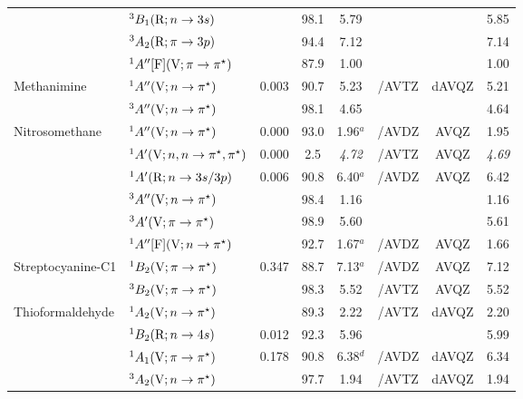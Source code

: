 \begin{tabular}{llcccccc}
                        &$^3B_1 (\mathrm{R};n \rightarrow 3s)$ 						&		&98.1 &5.79		&			&			&5.85	\\
                        &$^3A_2 (\mathrm{R};\pi \rightarrow 3p)$ 						&		&94.4 &7.12		&			&			&7.14	\\
                        &$^1A^{\prime\prime} [\mathrm{F}] (\mathrm{V};\pi \rightarrow \pi^\star)$		&		&87.9 &1.00		&			 & 			&1.00	\\
      Methanimine	&$^1A^{\prime\prime}(\mathrm{V}; n \rightarrow \pi^\star)$ 					&0.003	&90.7 &5.23		&{\exCI}/AVTZ & dAVQZ		&5.21	\\
                        &$^3A^{\prime\prime} (\mathrm{V}; n \rightarrow \pi^\star)$					&		&98.1 &4.65		&			&			&4.64	\\	
      Nitrosomethane&$^1A^{\prime\prime} (\mathrm{V};n \rightarrow \pi^\star)$					& 0.000	&93.0 &1.96$^a$	& {\exCI}/AVDZ & AVQZ		&1.95	 \\
                        &$^1A^\prime (\mathrm{V};n,n \rightarrow \pi^\star,\pi^\star)$				&0.000	&2.5	  &\emph{4.72}		& {\exCI}/AVTZ & AVQZ		& \emph{4.69}	\\
                        &$^1A^\prime (\mathrm{R};n \rightarrow 3s/3p)$ 						&0.006	&90.8 &6.40$^a$	&{\exCI}/AVDZ	& AVQZ		&6.42 	\\
                        &$^3A^{\prime\prime} (\mathrm{V};n \rightarrow \pi^\star)$					&		&98.4 &1.16		&			&			&1.16 	\\
                        &$^3A^\prime (\mathrm{V};\pi \rightarrow \pi^\star)$					&		&98.9 &5.60		&			&			&5.61	\\
                        &$^1A^{\prime\prime} [\mathrm{F}]	(\mathrm{V};n \rightarrow \pi^\star)$			&		&92.7&1.67$^a$	&{\exCI}/AVDZ	& AVQZ		&1.66	\\
      Streptocyanine-C1&$^1B_2 (\mathrm{V};\pi \rightarrow \pi^\star)$ 				& 0.347	&88.7&7.13$^a$	& {\exCI}/AVDZ & AVQZ		&7.12	\\
                        &	$^3B_2 (\mathrm{V};\pi \rightarrow \pi^\star)$ 				& 		&98.3 &5.52		& {\exCI}/AVTZ & AVQZ		&5.52	 \\
      Thioformaldehyde&$^1A_2 (\mathrm{V};n \rightarrow \pi^\star)$ 				&		&89.3 &2.22		&  {\exCI}/AVTZ & dAVQZ		&2.20	\\
                        &$^1B_2 (\mathrm{R};n \rightarrow 4s)$ 						& 0.012	&92.3 &5.96		&			&			&5.99	\\
                        &$^1A_1 (\mathrm{V};\pi \rightarrow \pi^\star)$				& 0.178	&90.8 &6.38$^d$	&{\CCSDTQ}/AVDZ& dAVQZ	&6.34	\\
                        &$^3A_2 (\mathrm{V};n \rightarrow \pi^\star)$ 					&		&97.7 &1.94		&{\exCI}/AVTZ & dAVQZ		&1.94	\\

\end{tabular}
